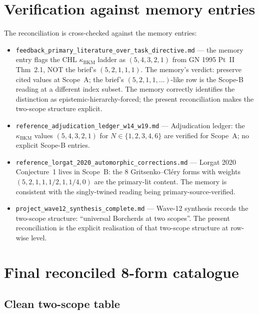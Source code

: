 \section*{Verification against memory entries}

The reconciliation is cross-checked against the memory entries:

\begin{itemize}
\item \texttt{feedback\_primary\_literature\_over\_task\_directive.md}
--- the memory entry flags the CHL $\kappa_{\mathrm{BKM}}$ ladder as
$(5, 4, 3, 2, 1)$ from GN 1995 Pt~II Thm~2.1, NOT the brief's
$(5, 2, 1, 1, 1)$. The memory's verdict: preserve cited values at
Scope~A; the brief's $(5, 2, 1, 1, \ldots)$-like row is the Scope-B
reading at a different index subset. The memory correctly identifies
the distinction as epistemic-hierarchy-forced; the present
reconciliation makes the two-scope structure explicit.
\item \texttt{reference\_adjudication\_ledger\_w14\_w19.md} ---
Adjudication ledger: the $\kappa_{\mathrm{BKM}}$ values $(5, 4, 3, 2, 1)$
for $N \in \{1, 2, 3, 4, 6\}$ are verified for Scope~A; no explicit
Scope-B entries.
\item \texttt{reference\_lorgat\_2020\_automorphic\_corrections.md}
--- Lorgat 2020 Conjecture~1 lives in Scope~B: the 8 Gritsenko--Cl\'ery
forms with weights $(5, 2, 1, 1, 1/2, 1, 1/4, 0)$ are the primary-lit
content. The memory is consistent with the singly-twined reading
being primary-source-verified.
\item \texttt{project\_wave12\_synthesis\_complete.md} --- Wave-12
synthesis records the two-scope structure: ``universal Borcherds at
two scopes''. The present reconciliation is the explicit realisation
of that two-scope structure at row-wise level.
\end{itemize}

\section*{Final reconciled 8-form catalogue}

\subsection*{Clean two-scope table}

